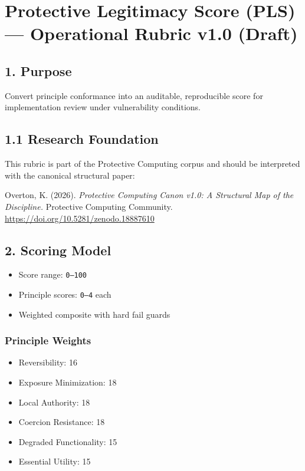 \documentclass[
]{article}
\author{}
\date{}
\providecommand{\tightlist}{%
  \setlength{\itemsep}{0pt}\setlength{\parskip}{0pt}}
\begin{document}
\section{Protective Legitimacy Score (PLS) --- Operational Rubric v1.0
(Draft)}\label{protective-legitimacy-score-pls--operational-rubric-v10-draft}

\subsection{1. Purpose}\label{1-purpose}

Convert principle conformance into an auditable, reproducible score for
implementation review under vulnerability conditions.

\subsection{1.1 Research Foundation}\label{11-research-foundation}

This rubric is part of the Protective Computing corpus and should be
interpreted with the canonical structural paper:

Overton, K. (2026). \emph{Protective Computing Canon v1.0: A Structural
Map of the Discipline.} Protective Computing Community.
\url{https://doi.org/10.5281/zenodo.18887610}

\subsection{2. Scoring Model}\label{2-scoring-model}

\begin{itemize}
\tightlist
\item
  Score range: \texttt{0–100}
\item
  Principle scores: \texttt{0–4} each
\item
  Weighted composite with hard fail guards
\end{itemize}

\subsubsection{Principle Weights}\label{principle-weights}

\begin{itemize}
\tightlist
\item
  Reversibility: 16
\item
  Exposure Minimization: 18
\item
  Local Authority: 18
\item
  Coercion Resistance: 18
\item
  Degraded Functionality: 15
\item
  Essential Utility: 15
\end{itemize}
\end{document}

